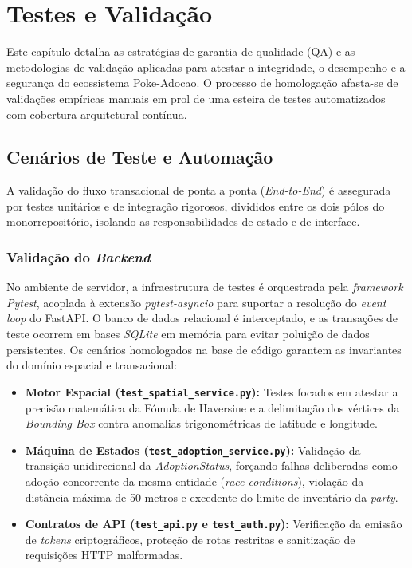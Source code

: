 \chapter{Testes e Validação}

Este capítulo detalha as estratégias de garantia de qualidade (QA) e as metodologias de validação aplicadas para atestar a integridade, o desempenho e a segurança do ecossistema Poke-Adocao. O processo de homologação afasta-se de validações empíricas manuais em prol de uma esteira de testes automatizados com cobertura arquitetural contínua.

\section{Cenários de Teste e Automação}

A validação do fluxo transacional de ponta a ponta (\textit{End-to-End}) é assegurada por testes unitários e de integração rigorosos, divididos entre os dois pólos do monorrepositório, isolando as responsabilidades de estado e de interface.

\subsection{Validação do \textit{Backend}}
No ambiente de servidor, a infraestrutura de testes é orquestrada pela \textit{framework} \textit{Pytest}, acoplada à extensão \textit{pytest-asyncio} para suportar a resolução do \textit{event loop} do FastAPI. O banco de dados relacional é interceptado, e as transações de teste ocorrem em bases \textit{SQLite} em memória para evitar poluição de dados persistentes.
Os cenários homologados na base de código garantem as invariantes do domínio espacial e transacional:
\begin{itemize}
    \item \textbf{Motor Espacial (\texttt{test\_spatial\_service.py}):} Testes focados em atestar a precisão matemática da Fómula de Haversine e a delimitação dos vértices da \textit{Bounding Box} contra anomalias trigonométricas de latitude e longitude.
    \item \textbf{Máquina de Estados (\texttt{test\_adoption\_service.py}):} Validação da transição unidirecional da \textit{AdoptionStatus}, forçando falhas deliberadas como adoção concorrente da mesma entidade (\textit{race conditions}), violação da distância máxima de 50 metros e excedente do limite de inventário da \textit{party}.
    \item \textbf{Contratos de API (\texttt{test\_api.py} e \texttt{test\_auth.py}):} Verificação da emissão de \textit{tokens} criptográficos, proteção de rotas restritas e sanitização de requisições HTTP malformadas.
\end{itemize}

